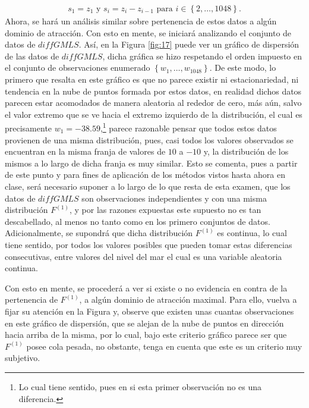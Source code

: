 \documentclass[10.5pt,notitlepage]{article}
\newcommand{\kis}[1]{\left\{ #1 \right\}}
\theoremstyle{plain}
\begin{document}
\begin{align*}
 s_1 = z_1 \text{ y } s_{i} = z_{i} -z_{i-1} \text{ para } i \in \kis{2, \hdots, 1048}.  
\end{align*}
Ahora, se hará un análisis similar sobre pertenencia de estos datos a algún dominio de atracción. Con esto en mente, se iniciará analizando el conjunto de datos de \(diffGMLS\). Así, en la Figura \ref{fig:17} puede ver un gráfico de dispersión de las datos de \(diffGMLS\), dicha gráfica se hizo respetando el orden impuesto en el conjunto de observaciones enumerado \(\kis{w_1, \hdots, w_{1048}}\). De este modo, lo primero que resalta en este gráfico es que no parece existir ni estacionariedad, ni tendencia en la nube de puntos formada por estos datos, en realidad dichos datos parecen estar acomodados de manera aleatoria al rededor de cero, más aún, salvo el valor extremo que se ve hacia el extremo izquierdo de la distribución, el cual es precisamente \(w_{1} = -38.59\),\footnote{Lo cual tiene sentido, pues en si esta primer observación no es una diferencia.} parece razonable pensar que todos estos datos provienen de una misma distribución, pues, casi todos los valores observados se encuentran en la misma franja de valores de \(10\) a \(-10\) y, la distribución de los mismos a lo largo de dicha franja es muy similar. Esto se comenta, pues a partir de este punto y para fines de aplicación de los métodos vistos hasta ahora en clase, será necesario suponer a lo largo de lo que resta de esta examen, que los datos de \(diffGMLS\) son observaciones independientes y con una misma distribución \(F^{(1)}\), y por las razones expuestas este supuesto no es tan descabellado, al menos no tanto como en los primero conjuntos de datos. Adicionalmente, se supondrá que dicha distribución \(F^{(1)}\) es continua, lo cual tiene sentido, por todos los valores posibles que pueden tomar estas diferencias consecutivas, entre valores del nivel del mar el cual es una variable aleatoria continua. 


Con esto en mente, se procederá a ver si existe o no evidencia en contra de la pertenencia de \(F^{(1)}\), a algún dominio de atracción maximal. Para ello, vuelva a fijar su atención en la Figura  y, observe que existen unas cuantas observaciones en este gráfico de dispersión, que se alejan de la nube de puntos en dirección hacia arriba de la misma, por lo cual, bajo este criterio gráfico parece ser que \(F^{(1)}\) posee cola pesada, no obstante, tenga en cuenta que este es un criterio muy subjetivo. 
\end{document}
